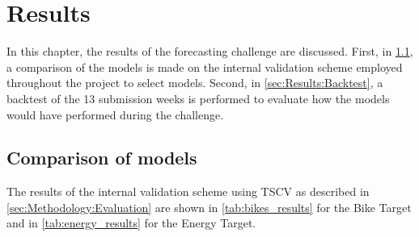 \newpage
\section{Results}
\label{ch:Results}

In this chapter, the results of the forecasting challenge are discussed. First, in \cref{sec:Results:ComparisonModels}, a comparison of the models is made on the internal validation scheme employed throughout the project to select models. Second, in \cref{sec:Results:Backtest}, a backtest of the 13 submission weeks is performed to evaluate how the models would have performed during the challenge. 

\subsection{Comparison of models}
\label{sec:Results:ComparisonModels}

The results of the internal validation scheme using TSCV as described in \cref{sec:Methodology:Evaluation} are shown in \cref{tab:bikes_results} for the Bike Target and in \cref{tab:energy_results} for the Energy Target. 

\begin{table}[htp]
\centering
{}
\caption{Results of Timeseries Cross-Validation on the Bike Target for the full year 2024 with weekly shifting of sliding windows. Best values are highlighted in bold.}
\label{tab:bikes_results}
\end{table}

